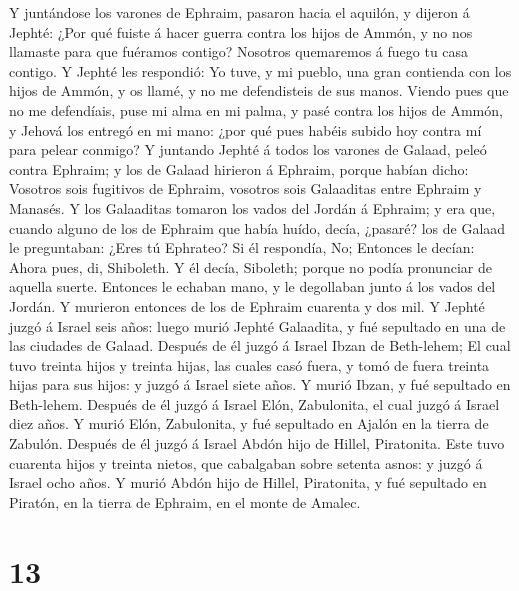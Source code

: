  Y juntándose los varones de Ephraim, pasaron hacia el
aquilón, y dijeron á Jephté: ¿Por qué fuiste á hacer guerra contra los
hijos de Ammón, y no nos llamaste para que fuéramos contigo? Nosotros
quemaremos á fuego tu casa contigo.  Y Jephté les respondió:
Yo tuve, y mi pueblo, una gran contienda con los hijos de Ammón, y os
llamé, y no me defendisteis de sus manos.  Viendo pues que
no me defendíais, puse mi alma en mi palma, y pasé contra los hijos de
Ammón, y Jehová los entregó en mi mano: ¿por qué pues habéis subido hoy
contra mí para pelear conmigo?  Y juntando Jephté á todos
los varones de Galaad, peleó contra Ephraim; y los de Galaad hirieron á
Ephraim, porque habían dicho: Vosotros sois fugitivos de Ephraim,
vosotros sois Galaaditas entre Ephraim y Manasés.  Y los
Galaaditas tomaron los vados del Jordán á Ephraim; y era que, cuando
alguno de los de Ephraim que había huído, decía, ¿pasaré? los de Galaad
le preguntaban: ¿Eres tú Ephrateo? Si él respondía, No; 
Entonces le decían: Ahora pues, di, Shiboleth. Y él decía, Siboleth;
porque no podía pronunciar de aquella suerte. Entonces le echaban mano,
y le degollaban junto á los vados del Jordán. Y murieron entonces de los
de Ephraim cuarenta y dos mil.  Y Jephté juzgó á Israel seis
años: luego murió Jephté Galaadita, y fué sepultado en una de las
ciudades de Galaad.  Después de él juzgó á Israel Ibzan de
Beth-lehem;  El cual tuvo treinta hijos y treinta hijas, las
cuales casó fuera, y tomó de fuera treinta hijas para sus hijos: y juzgó
á Israel siete años.  Y murió Ibzan, y fué sepultado en
Beth-lehem.  Después de él juzgó á Israel Elón, Zabulonita,
el cual juzgó á Israel diez años.  Y murió Elón,
Zabulonita, y fué sepultado en Ajalón en la tierra de Zabulón.
 Después de él juzgó á Israel Abdón hijo de Hillel,
Piratonita.  Este tuvo cuarenta hijos y treinta nietos, que
cabalgaban sobre setenta asnos: y juzgó á Israel ocho años.
 Y murió Abdón hijo de Hillel, Piratonita, y fué sepultado
en Piratón, en la tierra de Ephraim, en el monte de Amalec.

\hypertarget{section-12}{%
\section{13}\label{section-12}}

